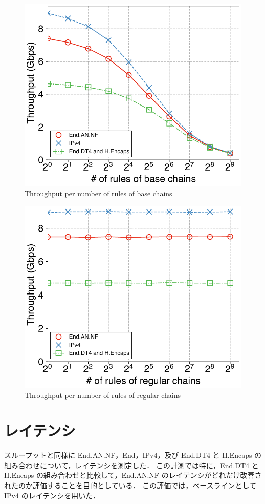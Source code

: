 \begin{figure}[t]
  \centering
  \includegraphics[width=0.95\linewidth]{img/rule-throughput.pdf}
  \caption{Throughput per number of rules of base chains}
  \label{fig:rule-thru}
\end{figure}

\begin{figure}[t]
  \centering
  \includegraphics[width=0.95\linewidth]{img/regular-throughput.pdf}
  \caption{Throughput per number of rules of regular chains}
  \label{fig:reg-thru}
\end{figure}

\section{レイテンシ}
\label{sec:eval.rtt}
スループットと同様に End.AN.NF，End，IPv4，及び End.DT4 と H.Encaps の組み合わせについて，レイテンシを測定した．
この計測では特に，End.DT4 と H.Encaps の組み合わせと比較して，End.AN.NF のレイテンシがどれだけ改善されたのか評価することを目的としている．
この評価では，ベースラインとして IPv4 のレイテンシを用いた．

